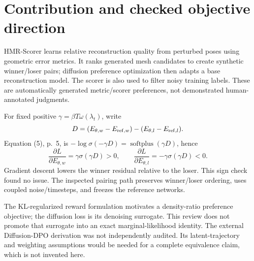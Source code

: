 \documentclass[10pt]{article}
\begin{document}
\section*{Contribution and checked objective direction}
HMR-Scorer learns relative reconstruction quality from perturbed poses using geometric error metrics. It ranks generated mesh candidates to create synthetic winner/loser pairs; diffusion preference optimization then adapts a base reconstruction model. The scorer is also used to filter noisy training labels. These are automatically generated metric/scorer preferences, not demonstrated human-annotated judgments.\par
For fixed positive \(\gamma=\beta T\omega(\lambda_t)\), write \[D=(E_{\theta,w}-E_{{\rm ref},w})
  -(E_{\theta,l}-E_{{\rm ref},l}).\] Equation (5), p. 5, is \(-\log\sigma(-\gamma D)
=\operatorname{softplus}(\gamma D)\), hence \[\frac{\partial L}{\partial E_{\theta,w}}
 =\gamma\sigma(\gamma D)>0,\qquad
 \frac{\partial L}{\partial E_{\theta,l}}
 =-\gamma\sigma(\gamma D)<0.\] Gradient descent lowers the winner residual relative to the loser. This sign check found no issue. The inspected pairing path preserves winner/loser ordering, uses coupled noise/timesteps, and freezes the reference networks.\par
The KL-regularized reward formulation motivates a density-ratio preference objective; the diffusion loss is its denoising surrogate. This review does not promote that surrogate into an exact marginal-likelihood identity. The external Diffusion-DPO derivation was not independently audited. Its latent-trajectory and weighting assumptions would be needed for a complete equivalence claim, which is not invented here.\par
\end{document}
